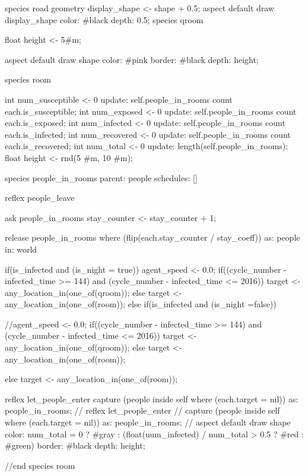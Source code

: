 \begin{verbatimtab}[4]
{        species road{
            geometry display_shape <- shape + 0.5;
            aspect default{
                draw display_shape color: #black depth: 0.5;
            }
        }
    species qroom{
        float height <- 5#m;
        
        aspect default {
            draw shape color: #pink border: #black depth: height;
        }
    }
        species room{
            int num_susceptible <- 0 update: self.people_in_rooms count each.is_susceptible;
            int num_exposed <- 0 update: self.people_in_rooms count each.is_exposed;
            int num_infected <- 0 update: self.people_in_rooms count each.is_infected;
            int num_recovered <- 0 update: self.people_in_rooms count each.is_recovered;
            int num_total <- 0 update: length(self.people_in_rooms);
            float height <- rnd(5 #m, 10 #m);
            
            species people_in_rooms parent: people schedules: [] {
            }
            
            reflex people_leave {
                ask people_in_rooms {
                    stay_counter <- stay_counter + 1;
                }
            
                release people_in_rooms where (flip(each.stay_counter / stay_coeff)) as:
                 people in: world {
                    if(is_infected and (is_night = true)){
                        agent_speed <- 0.0;
                        if((cycle_number - infected_time >= 144) and (cycle_number - infected_time <= 2016)){
                            target <- any_location_in(one_of(qroom));
                        } else{
                            target <- any_location_in(one_of(room));
                        }
                    } else if(is_infected and (is_night =false)){
                        //agent_speed <- 0.0;
                        if((cycle_number - infected_time >= 144) and (cycle_number - infected_time <= 2016)){
                            target <- any_location_in(one_of(qroom));
                        } else{
                            target <- any_location_in(one_of(room));
                        }
                        
                    } else{
                        target <- any_location_in(one_of(room));
                    }
                }
            }
            reflex let_people_enter {
            capture (people inside self where (each.target = nil)) as: people_in_rooms;
        }
    //		reflex let_people_enter {
    //		capture (people inside self where (each.target = nil)) as: people_in_rooms;
    //	}
        aspect default {
            draw shape color: num_total = 0 ? #gray : (float(num_infected) / num_total > 0.5
             ? #red : #green) border: #black depth: height;
        }
        }//end species room
        
}
\end{verbatimtab}
